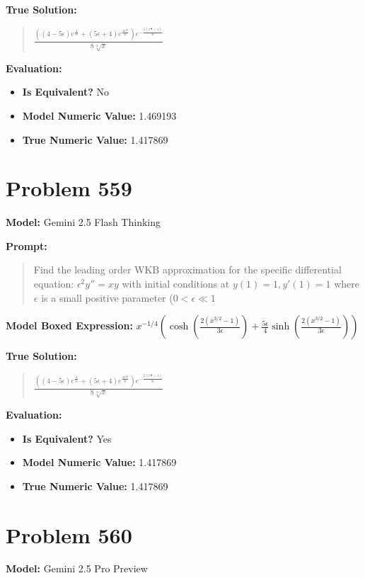 \documentclass{article}
\begin{document}
\textbf{True Solution:}
\begin{quote}
$\frac{\left(\left(4 - 5 \epsilon\right) e^{\frac{4}{3 \epsilon}} + \left(5 \epsilon + 4\right) e^{\frac{4 x^{\frac{3}{2}}}{3 \epsilon}}\right) e^{- \frac{2 \left(x^{\frac{3}{2}} + 1\right)}{3 \epsilon}}}{8 \sqrt[4]{x}}$
\end{quote}

\textbf{Evaluation:}
\begin{itemize}
\item \textbf{Is Equivalent?} No
\item \textbf{Model Numeric Value:} 1.469193
\item \textbf{True Numeric Value:} 1.417869
\end{itemize}
\vspace{1cm}
\section*{Problem 559}
\textbf{Model:} Gemini 2.5 Flash Thinking

\textbf{Prompt:}
\begin{quote}
Find the leading order WKB approximation for the specific differential equation: $\epsilon^2 y'' = x y$ with initial conditions at $y(1)=1,y'(1)=1$ where $\epsilon$ is a small positive parameter ($0 < \epsilon \ll 1$
\end{quote}
\textbf{Model Boxed Expression:} $x^{-1/4} \left( \cosh\left(\frac{2(x^{3/2}-1)}{3\epsilon}\right) + \frac{5\epsilon}{4}\sinh\left(\frac{2(x^{3/2}-1)}{3\epsilon}\right) \right)$

\textbf{True Solution:}
\begin{quote}
$\frac{\left(\left(4 - 5 \epsilon\right) e^{\frac{4}{3 \epsilon}} + \left(5 \epsilon + 4\right) e^{\frac{4 x^{\frac{3}{2}}}{3 \epsilon}}\right) e^{- \frac{2 \left(x^{\frac{3}{2}} + 1\right)}{3 \epsilon}}}{8 \sqrt[4]{x}}$
\end{quote}

\textbf{Evaluation:}
\begin{itemize}
\item \textbf{Is Equivalent?} Yes
\item \textbf{Model Numeric Value:} 1.417869
\item \textbf{True Numeric Value:} 1.417869
\end{itemize}
\vspace{1cm}
\section*{Problem 560}
\textbf{Model:} Gemini 2.5 Pro Preview
\end{document}
